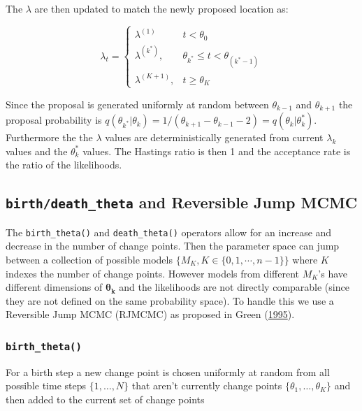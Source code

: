 \documentclass[11pt,a4paper]{article}
\numberwithin{equation}{section}
\begin{document}
The \(\lambda\) are then updated to match the newly proposed location
as:

\[ \lambda_t =  \begin{cases} \lambda^{(1)} & t < \theta_0 \\
\lambda^{(k^*)}, & \theta_{k^*} \leq t < \theta_{(k^*-1)} \\
\lambda^{(K+1)}, & t \geq \theta_K \end{cases}\]

Since the proposal is generated uniformly at random between
\(\theta_{k-1}\) and \(\theta_{k+1}\) the proposal probability is
\(q(\theta_{k^*}|\theta_k) = 1/(\theta_{k+1}-\theta_{k-1}-2) = q(\theta_k|\theta_k^*)\).
Furthermore the the \(\lambda\) values are deterministically generated
from current \(\lambda_k\) values and the \(\theta_k^*\) values. The
Hastings ratio is then 1 and the acceptance rate is the ratio of the
likelihoods.

\hypertarget{birthdeath_theta-and-reversible-jump-mcmc}{%
\subsection{\texorpdfstring{\texttt{birth/death\_theta} and Reversible
Jump
MCMC}{birth/death\_theta and Reversible Jump MCMC}}\label{birthdeath_theta-and-reversible-jump-mcmc}}

The \texttt{birth\_theta()} and \texttt{death\_theta()} operators allow
for an increase and decrease in the number of change points. Then the
parameter space can jump between a collection of possible models
\(\{M_K, K \in \{0,1,\cdots,n-1\}\}\) where \(K\) indexes the number of
change points. However models from different \(M_K\)'s have different
dimensions of \(\boldsymbol{\theta_k}\) and the likelihoods are not
directly comparable (since they are not defined on the same probability
space). To handle this we use a Reversible Jump MCMC (RJMCMC) as
proposed in Green (\protect\hyperlink{ref-green_reversible_1995}{1995}).

\hypertarget{birth_theta}{%
\subsubsection{\texorpdfstring{\texttt{birth\_theta()}}{birth\_theta()}}\label{birth_theta}}

For a birth step a new change point is chosen uniformly at random from
all possible time steps \(\{1,\dots,N\}\) that aren't currently change
points \(\{\theta_1,\dots,\theta_K\}\) and then added to the current set
of change points
\end{document}
